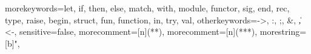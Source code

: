 \newcommand{\setlangcoq}{
\lstset{
  language=MyCoq, tabsize=2, frame=single, breaklines=true,
  basicstyle=\ttfamily, framexleftmargin=1mm, xleftmargin=1mm
}
}



  {morekeywords={let, if, then, else, match, with, module,
      functor, sig, end, rec, type, raise, begin, struct, fun, function,
      in, try, val},
    otherkeywords={->, :, ;, \&, \|, <-},
    sensitive=false,
    morecomment=[n]{(*}{*)},   %
    morecomment=[n]{(**}{*)},  %
    morestring=[b]",
  }

\newcommand{\setlangocaml}{
\lstset{
  language=MyOCaml, tabsize=2, frame=single, breaklines=true,
  basicstyle=\ttfamily, framexleftmargin=1mm, xleftmargin=1mm
}
}
